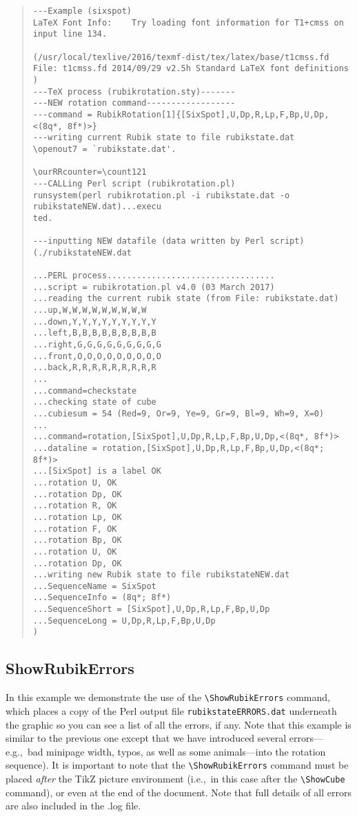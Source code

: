 \documentclass[a4paper]{article}
\begin{document}
\begin{quote}
\begin{verbatim} 
---Example (sixspot)
LaTeX Font Info:    Try loading font information for T1+cmss on input line 134.

(/usr/local/texlive/2016/texmf-dist/tex/latex/base/t1cmss.fd
File: t1cmss.fd 2014/09/29 v2.5h Standard LaTeX font definitions
)
---TeX process (rubikrotation.sty)-------
---NEW rotation command------------------
---command = RubikRotation[1]{[SixSpot],U,Dp,R,Lp,F,Bp,U,Dp,<(8q*, 8f*)>}
---writing current Rubik state to file rubikstate.dat
\openout7 = `rubikstate.dat'.

\ourRRcounter=\count121
---CALLing Perl script (rubikrotation.pl)
runsystem(perl rubikrotation.pl -i rubikstate.dat -o rubikstateNEW.dat)...execu
ted.

---inputting NEW datafile (data written by Perl script)
(./rubikstateNEW.dat

...PERL process..................................
...script = rubikrotation.pl v4.0 (03 March 2017)
...reading the current rubik state (from File: rubikstate.dat)
...up,W,W,W,W,W,W,W,W,W
...down,Y,Y,Y,Y,Y,Y,Y,Y,Y
...left,B,B,B,B,B,B,B,B,B
...right,G,G,G,G,G,G,G,G,G
...front,O,O,O,O,O,O,O,O,O
...back,R,R,R,R,R,R,R,R,R
...
...command=checkstate
...checking state of cube
...cubiesum = 54 (Red=9, Or=9, Ye=9, Gr=9, Bl=9, Wh=9, X=0)
...
...command=rotation,[SixSpot],U,Dp,R,Lp,F,Bp,U,Dp,<(8q*, 8f*)>
...dataline = rotation,[SixSpot],U,Dp,R,Lp,F,Bp,U,Dp,<(8q*; 8f*)>
...[SixSpot] is a label OK
...rotation U, OK
...rotation Dp, OK 
...rotation R, OK
...rotation Lp, OK
...rotation F, OK
...rotation Bp, OK
...rotation U, OK
...rotation Dp, OK 
...writing new Rubik state to file rubikstateNEW.dat
...SequenceName = SixSpot
...SequenceInfo = (8q*; 8f*)
...SequenceShort = [SixSpot],U,Dp,R,Lp,F,Bp,U,Dp
...SequenceLong = U,Dp,R,Lp,F,Bp,U,Dp
)
\end{verbatim}
\end{quote}



\pagebreak

\subsection{ShowRubikErrors}


 In this example we demonstrate  the use of the  \verb!\ShowRubikErrors! command, 
 which  places a copy of  the Perl output file \verb!rubikstateERRORS.dat! 
 underneath the graphic so you can see a list of all the  errors, if any. 
 Note that this example is similar to the previous one except that we have  
 introduced several  errors---e.g.,~bad minipage width,  typos, as well as 
 some animals---into  the rotation sequence). 
 It is important to note that  the  \verb!\ShowRubikErrors! command must be 
 placed \textit{after}  the TikZ picture environment (i.e.,~in this case after 
the \verb!\ShowCube! command), or even at the end of the document. 
Note that full details of all errors are also included in the .log file. 
\end{document}
